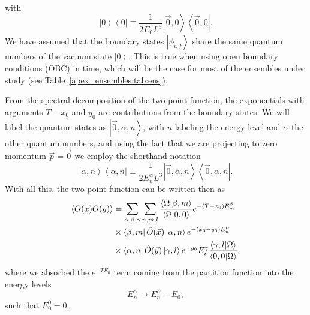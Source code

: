 with 
\begin{equation}
\left|0\right>\left<0\right|\equiv\frac{1}{2E_0L^3}\left|\vec{0},0\right>\left<\vec{0},0\right|.
\end{equation}
We have assumed that the boundary states $\left|\phi_{i,f}\right>$ share the same quantum numbers of the vacuum state $\left|0\right>$. This is true when using open boundary conditions (OBC) in time, which will be the case for most of the ensembles under study (see Table~\ref{apex_ensembles:tab:ens}).

From the spectral decomposition of the two-point function, the exponentials with arguments $T-x_0$ and $y_0$ are contributions from the boundary states. We will label the quantum states as $\left|\vec{0},\alpha,n\right>$, with $n$ labeling the energy level and $\alpha$ the other quantum numbers, and using the fact that we are projecting to zero momentum $\vec{p}=\vec{0}$ we employ the shorthand notation 
\begin{equation}
\left|\alpha,n\right>\left<\alpha,n\right|\equiv\frac{1}{2E_n^{\alpha}L^3}\left|\vec{0},\alpha,n\right>\left<\vec{0},\alpha,n\right|.
\end{equation}
With all this, the two-point function can be written then as
\begin{align}
\left<O(x)O(y)\right>&=\sum_{\alpha,\beta,\gamma}\sum_{n,m,l}\frac{\left<\Omega|\beta,m\right>}{\left<\Omega|0,0\right>}e^{-(T-x_0)E_m^{\beta}} \notag \\
&\times\left<\beta,m\right|\hat{O}(\vec{x})\left|\alpha,n\right>e^{-(x_0-y_0)E_n^{\alpha}} \notag \\
&\times\left<\alpha,n\right|\hat{O}(\vec{y})\left|\gamma,l\right>e^{-y_0}E_s^{\gamma}\frac{\left<\gamma,l|\Omega\right>}{\left<0,0|\Omega\right>},
\end{align}
where we absorbed the $e^{-TE_0}$ term coming from the partition function into the energy levels
\begin{equation}
E_n^{\alpha}\rightarrow E_n^{\alpha}-E_0,
\end{equation}
such that $E_0^0=0$.

